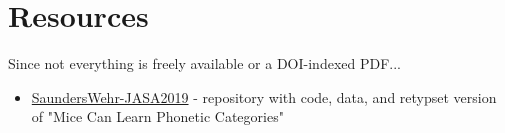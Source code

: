 





\section{Resources}

Since not everything is freely available or a DOI-indexed PDF...

\begin{itemize}
\item \href{https://github.com/wehr-lab/SaundersWehr-JASA2019}{SaundersWehr-JASA2019} - repository with code, data, and retypset version of "Mice Can Learn Phonetic Categories"
\end{itemize}
